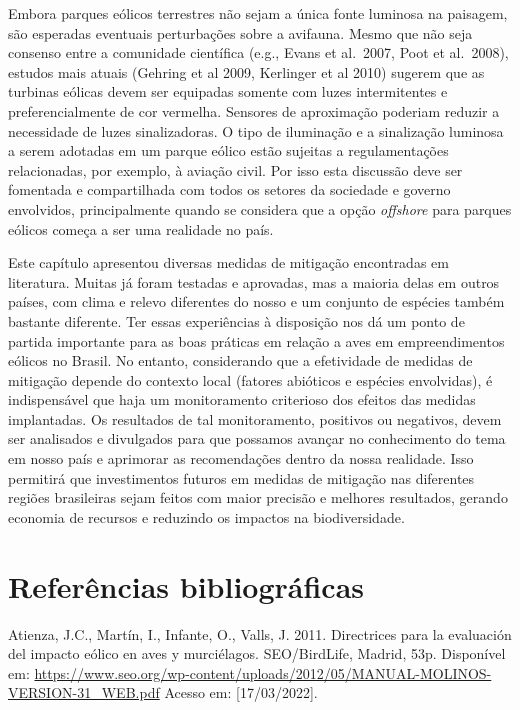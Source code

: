 \documentclass[
  oneside]{scrbook}
\begin{document}
Embora parques eólicos terrestres não sejam a única fonte luminosa na paisagem, são esperadas eventuais perturbações sobre a avifauna. Mesmo que não seja consenso entre a comunidade científica (e.g., Evans et al.~2007, Poot et al.~2008), estudos mais atuais (Gehring et al 2009, Kerlinger et al 2010) sugerem que as turbinas eólicas devem ser equipadas somente com luzes intermitentes e preferencialmente de cor vermelha. Sensores de aproximação poderiam reduzir a necessidade de luzes sinalizadoras. O tipo de iluminação e a sinalização luminosa a serem adotadas em um parque eólico estão sujeitas a regulamentações relacionadas, por exemplo, à aviação civil. Por isso esta discussão deve ser fomentada e compartilhada com todos os setores da sociedade e governo envolvidos, principalmente quando se considera que a opção \emph{offshore} para parques eólicos começa a ser uma realidade no país.

Este capítulo apresentou diversas medidas de mitigação encontradas em literatura. Muitas já foram testadas e aprovadas, mas a maioria delas em outros países, com clima e relevo diferentes do nosso e um conjunto de espécies também bastante diferente. Ter essas experiências à disposição nos dá um ponto de partida importante para as boas práticas em relação a aves em empreendimentos eólicos no Brasil. No entanto, considerando que a efetividade de medidas de mitigação depende do contexto local (fatores abióticos e espécies envolvidas), é indispensável que haja um monitoramento criterioso dos efeitos das medidas implantadas. Os resultados de tal monitoramento, positivos ou negativos, devem ser analisados e divulgados para que possamos avançar no conhecimento do tema em nosso país e aprimorar as recomendações dentro da nossa realidade. Isso permitirá que investimentos futuros em medidas de mitigação nas diferentes regiões brasileiras sejam feitos com maior precisão e melhores resultados, gerando economia de recursos e reduzindo os impactos na biodiversidade.

\hypertarget{referuxeancias-bibliogruxe1ficas-4}{%
\section{Referências bibliográficas}\label{referuxeancias-bibliogruxe1ficas-4}}

Atienza, J.C., Martín, I., Infante, O., Valls, J. 2011. Directrices para la evaluación del impacto eólico en aves y murciélagos. SEO/BirdLife, Madrid, 53p. Disponível em: \url{https://www.seo.org/wp-content/uploads/2012/05/MANUAL-MOLINOS-VERSION-31_WEB.pdf} Acesso em: {[}17/03/2022{]}.
\end{document}
